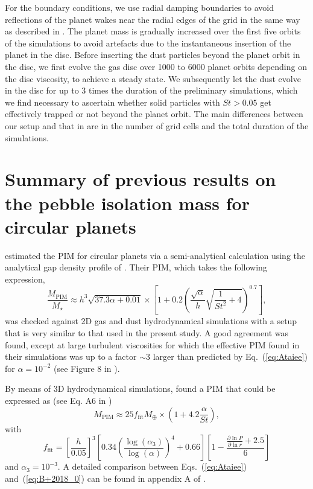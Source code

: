 \documentclass[fleqn,usenatbib]{mnras}
\begin{document}
For the boundary conditions, we use radial damping boundaries to avoid reflections of the planet wakes near the radial edges of the grid in the same way as described in \citet{deVal_etal2006}. The planet mass is gradually increased over the first five orbits of the simulations to avoid artefacts due to the instantaneous insertion of the planet in the disc. Before inserting the dust particles beyond the planet orbit in the disc, we first evolve the gas disc over 1000 to 6000 planet orbits depending on the disc viscosity, to achieve a steady state. We subsequently let the dust evolve in the disc for up to 3 times the duration of the preliminary simulations, which we find necessary to ascertain whether solid particles with $St>0.05$ get effectively trapped or not beyond the planet orbit. The main differences between our setup and that in \citet{Ataiee_etal2018} are in the number of grid cells and the total duration of the simulations.


\section{Summary of previous results on the pebble isolation mass for circular planets}
\label{sec:previously}
\citet{Ataiee_etal2018} estimated the PIM for circular planets via a semi-analytical calculation using the analytical gap density profile of \citet{2015ApJ...807L..11D}. Their PIM, which takes the following expression,
%
\begin{equation}
\frac{M_{\mathrm{PIM}}}{M_{\star}}\approx h^3\sqrt{37.3\alpha+0.01}\times \left[1+0.2\left(\frac{\sqrt{\alpha}}{h}\sqrt{\frac{1}{St^2}+4}\right)^{0.7}\right],
 \label{eq:Ataiee}
\end{equation}
%
\noindent was checked against 2D gas and dust hydrodynamical simulations with a setup that is very similar to that used in the present study. A good agreement was found, except at large turbulent viscosities for which the effective PIM found in their simulations was up to a factor $\sim$3 larger than predicted by Eq.~(\ref{eq:Ataiee}) for $\alpha=10^{-2}$ (see Figure 8 in \citealp{Ataiee_etal2018}).

By means of 3D hydrodynamical simulations, \citet{Bitsch_etal2018} found a PIM that could be expressed as (see Eq. A6 in \citealp{Ataiee_etal2018})
%
\begin{equation}
M_{\mathrm{PIM}} \approx 25f_{\mathrm{fit}}M_{\oplus} \times \left(1 + 4.2\frac{\alpha}{St}\right),
 \label{eq:B+2018_0}
\end{equation}
%
with
%
\begin{equation}
f_{\mathrm{fit}}=\left[\frac{h}{0.05}\right]^3\left[0.34\left(\frac{\log(\alpha_3)}{\log(\alpha)}\right)^4+0.66\right]\left[1-\frac{\frac{\partial \ln P}{\partial \ln r}+2.5}{6}\right]
 \label{eq:B+2018_1}
\end{equation}
%
and $\alpha_3=10^{-3}$. A detailed comparison between Eqs.~(\ref{eq:Ataiee}) and~(\ref{eq:B+2018_0}) can be found in appendix A of \citet{Ataiee_etal2018}.
\end{document}
